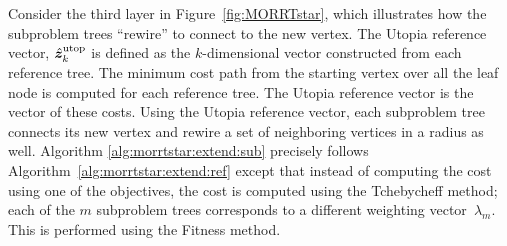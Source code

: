 \documentclass{article}
\begin{document}

Consider the third layer in Figure~\ref{fig:MORRTstar}, which illustrates how the subproblem trees ``rewire'' to connect to the new vertex.  
The Utopia reference vector, $ \hat{\bm{z}}_{k}^{\rm utop} $ is defined as the $k$-dimensional vector constructed from each reference tree.  
The minimum cost path from the starting vertex over all the leaf node is computed for each reference tree.  
The Utopia reference vector is the vector of these costs. 
Using the Utopia reference vector, each subproblem tree connects its new vertex and rewire a set of neighboring vertices in a radius as well. 
Algorithm \ref{alg:morrtstar:extend:sub} precisely follows Algorithm~\ref{alg:morrtstar:extend:ref} except that instead of computing the cost using one of the objectives, the cost is computed using the Tchebycheff method; each of the $m$ subproblem trees corresponds to a different weighting vector~$\lambda_m$.  
This is performed using the {\sc Fitness} method.
\end{document}
